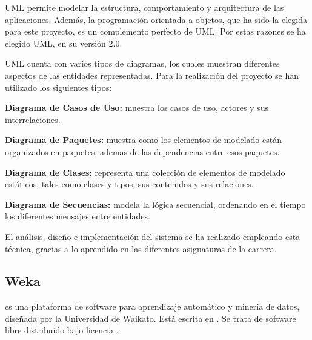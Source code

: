 UML permite modelar la estructura, comportamiento y arquitectura de las aplicaciones. Además, la programación orientada a objetos, que ha sido la elegida para este proyecto, es un complemento perfecto de UML. Por estas razones se ha elegido UML, en su versión 2.0.

UML cuenta con varios tipos de diagramas, los cuales muestran diferentes aspectos de las entidades
representadas. Para la realización del proyecto se han utilizado los siguientes tipos:

\begin{description}
\item \textbf{Diagrama de Casos de Uso:} muestra los casos de uso, actores y sus interrelaciones.
\item \textbf{Diagrama de Paquetes:} muestra como los elementos de modelado están organizados en
paquetes, ademas de las dependencias entre esos paquetes.
\item \textbf{Diagrama de Clases:} representa una colección de elementos de modelado estáticos, tales
como clases y tipos, sus contenidos y sus relaciones.
\item \textbf{Diagrama de Secuencias:} modela la lógica secuencial, ordenando en el tiempo los diferentes
mensajes entre entidades.
\end{description}

El análisis, diseño e implementación del sistema se ha realizado empleando esta técnica, gracias a lo aprendido en las diferentes asignaturas de la carrera.


\subsection{Weka}
\weka{}\cite{weka} es una plataforma de software para aprendizaje automático y minería de datos, diseñada por la Universidad de Waikato. Está escrita en \java{}. Se trata de software libre distribuido bajo licencia \gnu{}.

